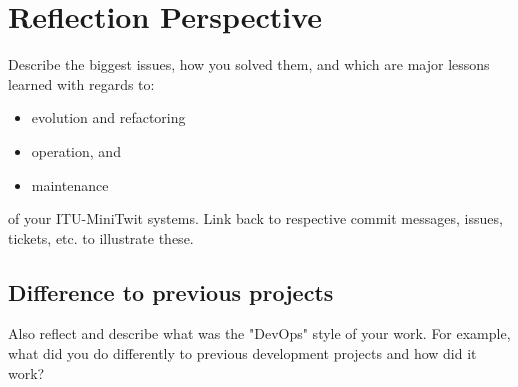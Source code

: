 \section{Reflection Perspective}

Describe the biggest issues, how you solved them, and which are major lessons learned with regards to:

\begin{itemize}
    \item evolution and refactoring
    \item operation, and 
    \item maintenance
\end{itemize}
of your ITU-MiniTwit systems. Link back to respective commit messages, issues, tickets, etc. to illustrate these.

\subsection{Difference to previous projects} %
Also reflect and describe what was the "DevOps" style of your work. For example, what did you do differently to previous development projects and how did it work?
